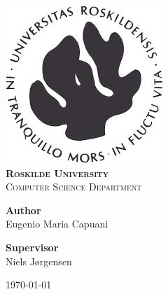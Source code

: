 \begin{titlepage}
\begin{center}
	\includegraphics[scale = 0.75]{figures/ruc_real_logo.png}\\[1.0 cm]	%
	\textsc{\LARGE\bfseries Roskilde University}\\[2.0 cm]	%
	\vspace{-1.9cm}
	\textsc{\Large  Computer Science Department}\\[0.5 cm]	
\end{center}
\vspace{1.5cm}
 \begin{flushleft}
	{\large\bfseries
		Author%
	}\\
	\vspace{0.2cm}
	{\Large
		Eugenio Maria Capuani%
	}
	
\end{flushleft}
\begin{flushright}
	\vspace{-1.6cm}
	{\large\bfseries
		Supervisor%
	}\\
	\vspace{0.2cm}
	{\Large
		Niels Jørgensen %
	}
	
\end{flushright}
\vspace{1cm}
  \vfill
  \begin{center}
  \today
  \end{center}
\end{titlepage}
